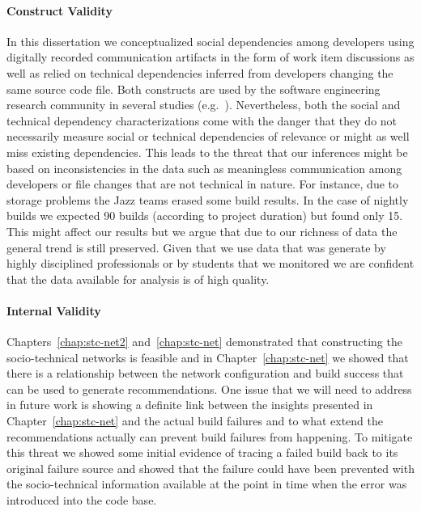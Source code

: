 \paragraph{Construct Validity}
In this dissertation we conceptualized social dependencies among developers using digitally recorded communication artifacts in the form of work item discussions as well as relied on technical dependencies inferred from developers changing the same source code file.
Both constructs are used by the software engineering research community in several studies (e.g.~\cite{cataldo:cscw:2006}).
Nevertheless, both the social and technical dependency characterizations come with the danger that they do not necessarily measure social or technical dependencies of relevance or might as well miss existing dependencies.
This leads to the threat that our inferences might be based on inconsistencies in the data such as meaningless communication among developers or file changes that are not technical in nature.
For instance, due to storage problems the Jazz teams erased some build results. In the case of
nightly builds we expected 90 builds (according to project duration) but found
only 15. This might affect our results but we argue that due to our richness of
data the general trend is still preserved.
Given that we use data that was generate by highly disciplined professionals or by students that we monitored we are confident that the data available for analysis is of high quality.

\paragraph{Internal Validity}
Chapters~\ref{chap:stc-net2} and~\ref{chap:stc-net} demonstrated that constructing the socio-technical networks is feasible and in Chapter~\ref{chap:stc-net} we showed that there is a relationship between the network configuration and build success that can be used to generate recommendations.
One issue that we will need to address in future work is showing a definite link between the insights presented in Chapter~\ref{chap:stc-net} and the actual build failures and to what extend the recommendations actually can prevent build failures from happening. 
To mitigate this threat we showed some initial evidence of tracing a failed build back to its original failure source and showed that the failure could have been prevented with the socio-technical information available at the point in time when the error was introduced into the code base.

